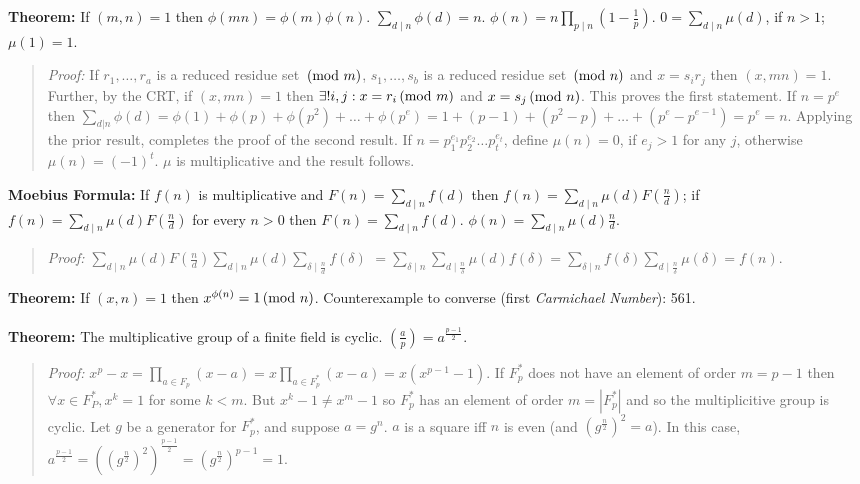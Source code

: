 {\bf Theorem:} 
If $(m,n)=1$ then $\phi(mn)= \phi(m) \phi(n)$.
$ \sum_{d \mid n} \phi(d)= n$.
$ \phi(n)=  n \prod_{p \mid n} (1- {\frac {1} {p}})$.
$ 0=  \sum_{d \mid n} \mu(d)$, if $n>1$; $\mu(1)=1$.
\begin{quote}
\emph{Proof:}
If $r_1, \ldots, r_a$ is a reduced residue set $\thinspace \textnormal{(mod } m \textnormal{)}$,
$s_1, \ldots , s_b$ is a reduced residue set $\thinspace \textnormal{(mod } n \textnormal{)}$ and
$x= s_i r_j$ then $(x,mn)=1$.  Further, by the CRT, if
$(x, mn)=1$ then $\exists ! i, j: x= r_i \thinspace \textnormal{(mod } m \textnormal{)}$ and $x= s_j \thinspace \textnormal{(mod } n \textnormal{)}$.  This proves
the first statement.  If $n= p^e$ then
$\sum_{d|n} \phi(d)= \phi(1) + \phi(p) + \phi(p^2) + \ldots + \phi(p^e)=
1 + (p-1) + (p^2-p) + \ldots + (p^e - p^{e-1})= p^e = n$.  Applying the prior result,
completes the proof of the second result.  If $n= p_1^{e_1} p_2^{e_2} \ldots p_t^{e_t}$,
define $\mu(n)=0$, if $e_j > 1$ for any $j$, otherwise $\mu(n)= (-1)^t$.  $\mu$ is
multiplicative and the result follows.
\end{quote}
{\bf Moebius Formula:} If $f(n)$ is multiplicative and 
$F(n)=  \sum_{d \mid n} f(d)$ then
$f(n)= \sum_{d \mid n} \mu(d) F({\frac {n} {d}})$;  if
$f(n)= \sum_{d \mid n} \mu(d) F({\frac {n} {d}})$ for every $n>0$ then
$F(n)=  \sum_{d \mid n} f(d)$.
$\phi(n)=  \sum_{d \mid n} \mu(d) {\frac {n} {d}}$.
\begin{quote}
\emph{Proof:}
$\sum_{d \mid n} \mu(d) F({\frac {n} {d}})
\sum_{d \mid n} \mu(d) \sum_{\delta  \mid  {\frac n d}} f(\delta)$
$=\sum_{\delta  \mid n} \sum_{d  \mid  {\frac n \delta}} \mu(d) f(\delta)=
\sum_{\delta  \mid n} f(\delta) \sum_{d  \mid  {\frac n \delta}} \mu(\delta) = f(n)$.
\end{quote}
{\bf Theorem:} If $(x,n)=1$ then $x^{\phi(n)}= 1 \thinspace \textnormal{(mod } n \textnormal{)}$.  Counterexample to converse
(first \emph{Carmichael Number}): 561.
\\
\\
{\bf Theorem:}
The multiplicative group of a finite field is cyclic.
$({\frac {a} {p}}) = a^{\frac {p-1} {2}}$.
\begin{quote}
\emph{Proof:}
$x^p-x = \prod_{a \in F_p} (x-a) = x \prod_{a \in F_p^*} (x-a) = x (x^{p-1} -1) $.
If $F_p^*$ does not have an element of order $m=p-1$ then $\forall x \in F_P^*, x^k = 1$
for some $k < m$. But $x^k-1 \ne x^m -1$ so $F_p^*$ has an element of order
$m = |F_p^*|$ and so the multiplicitive group is cyclic.  Let $g$ be a generator for
$F_p^*$, and suppose $a = g^n$.  $a$ is a square iff $n$ is even (and $(g^{\frac n 2})^2 = a$).
In this case, 
$a^{\frac {p-1} {2}}= ((g^{\frac n 2})^2)^{\frac {p-1} 2} = (g^{\frac n 2})^{p-1} = 1$.
\end{quote}
